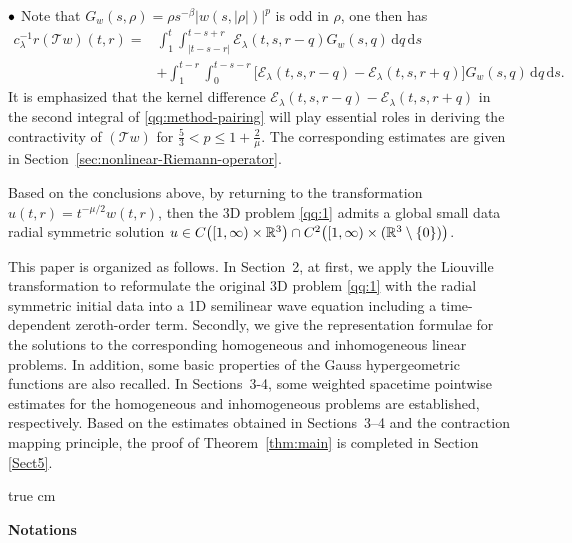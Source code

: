 \documentclass[11pt,twoside]{article}
\newcommand{\f}{\frac}
\newcommand{\Ecal}{\mathcal E}
\newcommand{\Tcal}{\mathcal T}
\theoremstyle{plain}
\theoremstyle{definition}
\theoremstyle{remark}
\numberwithin{equation}{section}
\begin{document}
\medskip


${\bf \bullet}$ Note that
$G_w(s,\rho)=\rho s^{-\beta}|w(s,|\rho|)|^p$
is odd in $\rho$, one then has
\begin{equation}
\label{qq:method-pairing}
\begin{aligned}
c_\lambda^{-1}r(\Tcal w)(t,r)
={}&\int_1^t\int_{|t-s-r|}^{t-s+r}
\Ecal_\lambda(t,s,r-q)G_w(s,q)\,\mathrm dq\,\mathrm ds\\
&+\int_1^{t-r}\int_0^{t-s-r}
\bigl[\Ecal_\lambda(t,s,r-q)-\Ecal_\lambda(t,s,r+q)\bigr]
G_w(s,q)\,\mathrm dq\,\mathrm ds.
\end{aligned}
\end{equation}
It is emphasized that the kernel difference
$\Ecal_\lambda(t,s,r-q)-\Ecal_\lambda(t,s,r+q)$
in the second integral of \eqref{qq:method-pairing} will play essential roles in
deriving the contractivity of $(\Tcal w)$ for
$\f{5}{3}<p\leq1+\f{2}{\mu}$. The corresponding estimates are given in
Section~\ref{sec:nonlinear-Riemann-operator}.

\medskip

Based on the conclusions above, by returning to the transformation
$u(t,r)=t^{-\mu/2}w(t,r)$, then the 3D problem \eqref{qq:1} admits a global small data radial
symmetric solution $u\in C\bigl([1,\infty)\times\Bbb R^3\bigr)
\cap C^2\bigl([1,\infty)\times(\Bbb R^3\setminus\{0\})\bigr)$.









This paper is organized as follows. In Section~2, at first, we apply the
Liouville transformation to reformulate the original
3D problem \eqref{qq:1} with the radial symmetric initial data into a 1D semilinear wave equation including a
time-dependent zeroth-order term. Secondly, we give the representation formulae
for the solutions to the corresponding homogeneous and inhomogeneous linear problems.
In addition, some basic properties of
the Gauss hypergeometric functions are also recalled.
In Sections~3-4, some weighted spacetime pointwise estimates for the
homogeneous and  inhomogeneous problems are established, respectively. Based on the estimates
obtained in Sections~3--4 and the contraction mapping principle,  the proof of Theorem~\ref{thm:main}
is completed in  Section \ref{Sect5}.




 true cm

\noindent\textbf{Notations}
\end{document}
